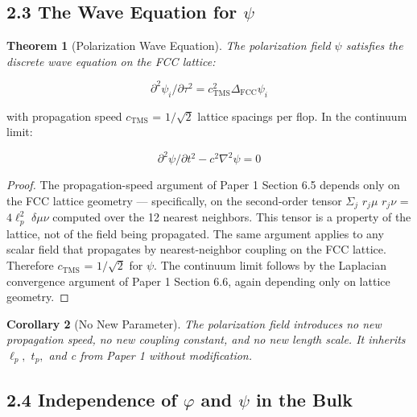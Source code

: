 \documentclass[11pt,oneside]{report}
\newtheorem{theorem}{Theorem}[section]
\newtheorem{corollary}[theorem]{Corollary}
\theoremstyle{definition}
\theoremstyle{remark}
\begin{document}
\subsection*{2.3 The Wave Equation for \ensuremath{\psi}}

\begin{theorem}[Polarization Wave Equation]
The polarization field \ensuremath{\psi} satisfies
the discrete wave equation on the FCC lattice:
\end{theorem}

\begin{equation*}
\partial ^{2}\psi_{i} / \partial \tau^{2} = c^{2}_{\mathrm{TMS}} \Delta_{\mathrm{FCC}} \psi_{i}
\end{equation*}

with propagation speed \ensuremath{c_{\mathrm{TMS}}} = \ensuremath{1/\sqrt{2}} lattice spacings per flop. In the
continuum limit:

\begin{equation*}
\partial ^{2}\psi / \partial t^{2} - c^{2}\nabla ^{2}\psi = 0
\end{equation*}

\begin{proof}
The propagation-speed argument of Paper 1 Section 6.5 depends
only on the FCC lattice geometry --- specifically, on the second-order
tensor \ensuremath{\Sigma_{j}} \ensuremath{r_{j}\mu} \ensuremath{r_{j}\nu} = \ensuremath{4\ell^{2}_{p}} \ensuremath{\delta \mu \nu} computed over the 12 nearest neighbors.
This tensor is a property of the lattice, not of the field being
propagated. The same argument applies to any scalar field that
propagates by nearest-neighbor coupling on the FCC lattice. Therefore
\ensuremath{c_{\mathrm{TMS}}} = \ensuremath{1/\sqrt{2}} for \ensuremath{\psi .} The continuum limit follows by the Laplacian
convergence argument of Paper 1 Section 6.6, again depending only on
lattice geometry.

\end{proof}

\begin{corollary}[No New Parameter]
The polarization field introduces no new
propagation speed, no new coupling constant, and no new length scale. It
inherits \ensuremath{\ell_{p},} \ensuremath{t_{p},} and c from Paper 1 without modification.
\end{corollary}

\subsection*{2.4 Independence of \ensuremath{\varphi} and \ensuremath{\psi} in the Bulk}
\end{document}
